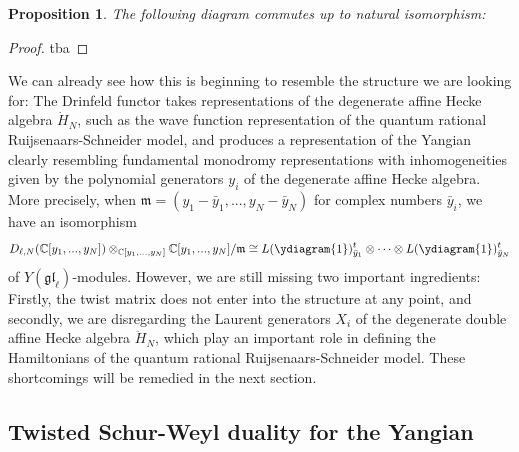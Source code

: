 \documentclass[11pt]{report}
\newtheorem{prop}[theorem]{Proposition}
\theoremstyle{definition}
\theoremstyle{remark}
\theoremstyle{remark}
\newcommand{\C}{\mathbb{C}}
\begin{document}
\begin{prop}
The following diagram commutes up to natural isomorphism:
\begin{center}
\end{center}
\end{prop}

\begin{proof}
tba
\end{proof}

We can already see how this is beginning to resemble the structure we are looking for: The Drinfeld functor takes representations of the degenerate affine Hecke algebra $\dot H_N$, such as the wave function representation of the quantum rational Ruijsenaars-Schneider model, and produces a representation of the Yangian clearly resembling fundamental monodromy representations with inhomogeneities given by the polynomial generators $y_i$ of the degenerate affine Hecke algebra. More precisely, when $\mathfrak{m} = (y_1-\bar y_1,...,y_N-\bar y_N)$ for complex numbers $\bar y_i$, we have an isomorphism
\begin{equation*}
D_{\ell,N}(\C[y_1,...,y_N]) \otimes_{\C[y_1,...,y_N]} \C[y_1,...,y_N]/\mathfrak{m} \cong L(\ydiagram{1})_{\bar y_1}^t \otimes \cdots \otimes L(\ydiagram{1})_{\bar y_N}^t
\end{equation*}
of $Y(\mathfrak{gl}_\ell)$-modules. However, we are still missing two important ingredients: Firstly, the twist matrix does not enter into the structure at any point, and secondly, we are disregarding the Laurent generators $X_i$ of the degenerate double affine Hecke algebra $\ddot H_N$, which play an important role in defining the Hamiltonians of the quantum rational Ruijsenaars-Schneider model. These shortcomings will be remedied in the next section.

\subsection{Twisted Schur-Weyl duality for the Yangian}
\end{document}
